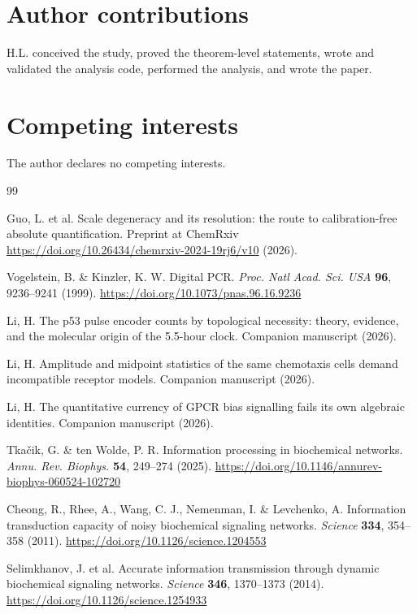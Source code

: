 \documentclass[11pt,a4paper]{article}
\begin{document}
\section*{Author contributions}

H.L. conceived the study, proved the theorem-level statements, wrote and validated the analysis code, performed the analysis, and wrote the paper.

\section*{Competing interests}

The author declares no competing interests.

\begin{thebibliography}{99}
\small

Guo, L. et al. Scale degeneracy and its resolution: the route to calibration-free absolute quantification. Preprint at ChemRxiv \url{https://doi.org/10.26434/chemrxiv-2024-19rj6/v10} (2026).

Vogelstein, B. \& Kinzler, K. W. Digital PCR. \emph{Proc. Natl Acad. Sci. USA} \textbf{96}, 9236--9241 (1999). \url{https://doi.org/10.1073/pnas.96.16.9236}

Li, H. The p53 pulse encoder counts by topological necessity: theory, evidence, and the molecular origin of the 5.5-hour clock. Companion manuscript (2026).

Li, H. Amplitude and midpoint statistics of the same chemotaxis cells demand incompatible receptor models. Companion manuscript (2026).

Li, H. The quantitative currency of GPCR bias signalling fails its own algebraic identities. Companion manuscript (2026).

Tka\v{c}ik, G. \& ten Wolde, P. R. Information processing in biochemical networks. \emph{Annu. Rev. Biophys.} \textbf{54}, 249--274 (2025). \url{https://doi.org/10.1146/annurev-biophys-060524-102720}

Cheong, R., Rhee, A., Wang, C. J., Nemenman, I. \& Levchenko, A. Information transduction capacity of noisy biochemical signaling networks. \emph{Science} \textbf{334}, 354--358 (2011). \url{https://doi.org/10.1126/science.1204553}

Selimkhanov, J. et al. Accurate information transmission through dynamic biochemical signaling networks. \emph{Science} \textbf{346}, 1370--1373 (2014). \url{https://doi.org/10.1126/science.1254933}


\end{thebibliography}
\end{document}
